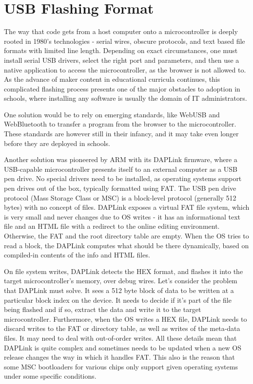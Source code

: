 \section{USB Flashing Format}
\label{sec:uf2}

The way that code gets from a host computer onto a microcontroller is deeply rooted in 1980's technologies - 
serial wires, obscure protocols, and text based file formats with limited line length. Depending on exact circumstances,
one must install serial USB drivers, select the right port and parameters, and then use a native application to access
the microcontroller, as the browser is not allowed to. As the advance of maker content in educational curricula continues,
this complicated flashing process presents one of the major obstacles to adoption in schools, where installing any software
is usually the domain of IT administrators.

One solution would be to rely on emerging standards, like WebUSB and WebBluetooth to transfer a program from the browser 
to the microcontroller. These standards are however still in their infancy, and it may take even longer before they are 
deployed in schools.

Another solution was pioneered by ARM with its DAPLink firmware, where a USB-capable microcontroller presents itself 
to an external computer as a USB pen drive. No special drivers need to be installed, as operating systems support pen
drives out of the box, typically formatted using FAT. The USB pen drive protocol (Mass Storage Class or MSC) is a
block-level protocol (generally 512 bytes) with no concept of files. DAPLink exposes a virtual FAT file system, which
is very small and never changes due to OS writes - it has an informational text file and an HTML file with a redirect
to the online editing environment. Otherwise, the FAT and the root directory table are empty. When the OS tries to
read a block, the DAPLink computes what should be there dynamically, based on compiled-in contents of the info and HTML files.

On file system writes, DAPLink detects the HEX format, and flashes it into the target microcontroller's memory,
over debug wires. Let's consider the problem that DAPLink must solve. It sees a 512 byte block of data to be written
at a particular block index on the device. It needs to decide if it's part of the file being flashed and if so, extract
the data and write it to the target microcontroller. Furthermore, when the OS writes a HEX file, DAPLink needs to discard
writes to the FAT or directory table, as well as writes of the meta-data files. It may need to deal with out-of-order writes.
All these details mean that DAPLink is quite complex and sometimes needs to be updated when a new OS release changes the way
in which it handles FAT. This also is the reason that some MSC bootloaders for various chips only support given operating
systems under some specific conditions.

